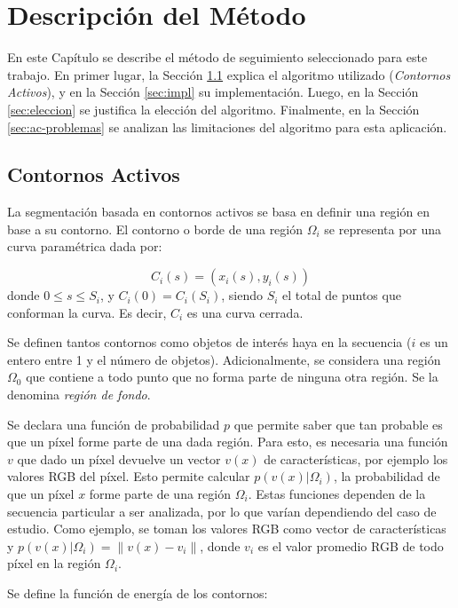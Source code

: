 \chapter{Descripción del Método}
\label{chap-ac}

En este Capítulo se describe el método de seguimiento seleccionado para este
trabajo. En primer lugar, la Sección \ref{sec:ac} explica el algoritmo
utilizado (\emph{Contornos Activos}), y en la Sección \ref{sec:impl} su
implementación. Luego, en la Sección \ref{sec:eleccion} se justifica la
elección del algoritmo. Finalmente, en la Sección \ref{sec:ac-problemas} se
analizan las limitaciones del algoritmo para esta aplicación.

\section{Contornos Activos}
\label{sec:ac}
La segmentación basada en contornos activos se basa en definir una región en
base a su contorno. El contorno o borde de una región $\Omega_i$ se representa
por una curva paramétrica dada por:

\begin{equation}
    C_i(s) = (x_i(s), y_i(s))
\end{equation}
donde $0 \leq s \leq S_i$, y $C_i(0) = C_i(S_i)$, siendo $S_i$ el total de
puntos que conforman la curva. Es decir, $C_i$ es una curva cerrada.

Se definen tantos contornos como objetos de interés haya en la secuencia ($i$
es un entero entre 1 y el número de objetos). Adicionalmente, se considera una
región $\Omega_0$ que contiene a todo punto que no forma parte de ninguna otra
región. Se la denomina \textit{región de fondo}.

Se declara una función de probabilidad $p$ que permite saber que tan probable
es que un píxel forme parte de una dada región. Para esto, es necesaria una
función $v$ que dado un píxel devuelve un vector $v(x)$ de características,
por ejemplo los valores RGB del píxel. Esto permite calcular $p(v(x) \vert
\Omega_i)$, la probabilidad de que un píxel $x$ forme parte de una región
$\Omega_i$. Estas funciones dependen de la secuencia particular a ser
analizada, por lo que varían dependiendo del caso de estudio. Como ejemplo, se
toman los valores RGB como vector de características y $p(v(x) \vert \Omega_i)
= \| v(x) - v_i \| $, donde $v_i$ es el valor promedio RGB de todo píxel en la
región $\Omega_i$.

Se define la función de energía de los contornos:

